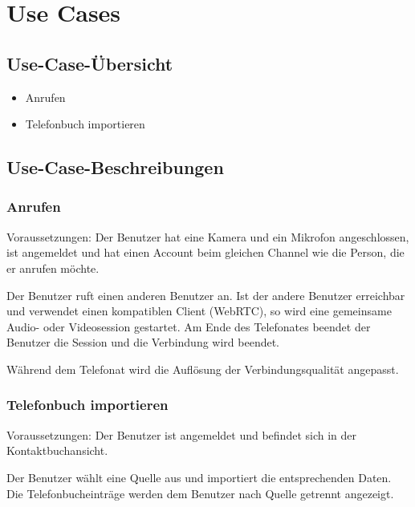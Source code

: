 \section{Use Cases}

	\subsection{Use-Case-Übersicht}
	\begin{itemize}
		\item Anrufen
		\item Telefonbuch importieren
	\end{itemize}

	\subsection{Use-Case-Beschreibungen}

		\subsubsection{Anrufen}
		Voraussetzungen: Der Benutzer hat eine Kamera und ein Mikrofon angeschlossen,
		ist angemeldet und hat einen Account beim gleichen Channel wie die Person, die
		er anrufen möchte.\newline

		Der Benutzer ruft einen anderen Benutzer an. Ist der andere Benutzer
		erreichbar und verwendet einen kompatiblen Client (WebRTC), so wird eine gemeinsame Audio- oder Videosession gestartet.
		Am Ende des Telefonates beendet der Benutzer die Session und die Verbindung
		wird beendet.

		Während dem Telefonat wird die Auflösung der Verbindungsqualität angepasst.

		\subsubsection{Telefonbuch importieren}
		Voraussetzungen: Der Benutzer ist angemeldet und befindet sich in der
		Kontaktbuchansicht.\newline
		
		Der Benutzer wählt eine Quelle aus und importiert die entsprechenden Daten. Die Telefonbucheinträge werden dem Benutzer nach Quelle getrennt angezeigt.
